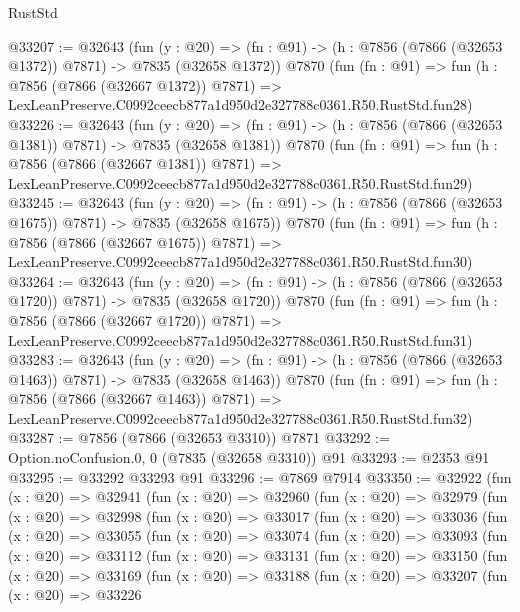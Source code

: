 \begin{lexlean}{RustStd}
\begin{coremodule}
@33207 := @32643
    (fun (y : @20) =>
    (fn : @91) -> (h : @7856 (@7866 (@32653 @1372)) @7871) -> @7835 (@32658 @1372))
    @7870
    (fun (fn : @91) =>
    fun (h : @7856 (@7866 (@32667 @1372)) @7871) =>
    LexLeanPreserve.C0992ceecb877a1d950d2e327788c0361.R50.RustStd.fun28)
@33226 := @32643
    (fun (y : @20) =>
    (fn : @91) -> (h : @7856 (@7866 (@32653 @1381)) @7871) -> @7835 (@32658 @1381))
    @7870
    (fun (fn : @91) =>
    fun (h : @7856 (@7866 (@32667 @1381)) @7871) =>
    LexLeanPreserve.C0992ceecb877a1d950d2e327788c0361.R50.RustStd.fun29)
@33245 := @32643
    (fun (y : @20) =>
    (fn : @91) -> (h : @7856 (@7866 (@32653 @1675)) @7871) -> @7835 (@32658 @1675))
    @7870
    (fun (fn : @91) =>
    fun (h : @7856 (@7866 (@32667 @1675)) @7871) =>
    LexLeanPreserve.C0992ceecb877a1d950d2e327788c0361.R50.RustStd.fun30)
@33264 := @32643
    (fun (y : @20) =>
    (fn : @91) -> (h : @7856 (@7866 (@32653 @1720)) @7871) -> @7835 (@32658 @1720))
    @7870
    (fun (fn : @91) =>
    fun (h : @7856 (@7866 (@32667 @1720)) @7871) =>
    LexLeanPreserve.C0992ceecb877a1d950d2e327788c0361.R50.RustStd.fun31)
@33283 := @32643
    (fun (y : @20) =>
    (fn : @91) -> (h : @7856 (@7866 (@32653 @1463)) @7871) -> @7835 (@32658 @1463))
    @7870
    (fun (fn : @91) =>
    fun (h : @7856 (@7866 (@32667 @1463)) @7871) =>
    LexLeanPreserve.C0992ceecb877a1d950d2e327788c0361.R50.RustStd.fun32)
@33287 := @7856 (@7866 (@32653 @3310)) @7871
@33292 := Option.noConfusion.{0, 0} (@7835 (@32658 @3310)) @91
@33293 := @2353 @91
@33295 := @33292 @33293 @91
@33296 := @7869 @7914
@33350 := @32922
    (fun (x : @20) =>
    @32941
      (fun (x : @20) =>
      @32960
        (fun (x : @20) =>
        @32979
          (fun (x : @20) =>
          @32998
            (fun (x : @20) =>
            @33017
              (fun (x : @20) =>
              @33036
                (fun (x : @20) =>
                @33055
                  (fun (x : @20) =>
                  @33074
                    (fun (x : @20) =>
                    @33093
                      (fun (x : @20) =>
                      @33112
                        (fun (x : @20) =>
                        @33131
                          (fun (x : @20) =>
                          @33150
                            (fun (x : @20) =>
                            @33169
                              (fun (x : @20) =>
                              @33188
                                (fun (x : @20) =>
                                @33207
                                  (fun (x : @20) =>
                                  @33226

\end{coremodule}
\end{lexlean}
